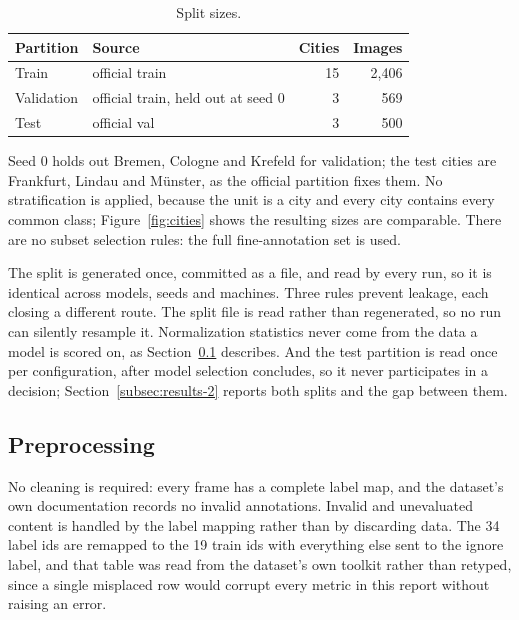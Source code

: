 \begin{table}[H]
\centering
\caption{Split sizes.}
\label{tab:splits}
\begin{tabular}{llrr}
\hline
\textbf{Partition} & \textbf{Source} & \textbf{Cities} & \textbf{Images} \\
\hline
Train      & official train                      & 15 & 2{,}406 \\
Validation & official train, held out at seed $0$ &  3 &   569 \\
Test       & official val                        &  3 &   500 \\
\hline
\end{tabular}
\end{table}

Seed $0$ holds out Bremen, Cologne and Krefeld for validation; the test cities are Frankfurt,
Lindau and Münster, as the official partition fixes them. No stratification is applied, because
the unit is a city and every city contains every common class;
Figure~\ref{fig:cities} shows the resulting sizes are comparable. There are no subset selection
rules: the full fine-annotation set is used.

The split is generated once, committed as a file, and read by every run, so it is identical
across models, seeds and machines. Three rules prevent leakage,
each closing a different route. The split file is read rather than regenerated, so no run can
silently resample it. Normalization statistics never come from the data a model is scored on,
as Section~\ref{subsec:problem-and-data-5} describes. And the test partition is read once per
configuration, after model selection concludes, so it never participates in a decision;
Section~\ref{subsec:results-2} reports both splits and the gap between them.

\subsection{Preprocessing}
\label{subsec:problem-and-data-5}

No cleaning is required: every frame has a complete label map, and the dataset's own
documentation records no invalid annotations. Invalid and unevaluated content is handled by the
label mapping rather than by discarding data. The 34 label ids are remapped to the 19 train ids
with everything else sent to the ignore label, and that table was read from the dataset's own
toolkit rather than retyped, since a single misplaced row would corrupt every metric in this
report without raising an error.


